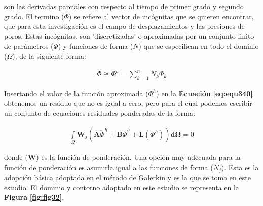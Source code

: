 son las derivadas parciales con respecto al tiempo de primer grado y segundo grado. El termino ($\Phi$) se refiere al vector de incógnitas que se quieren encontrar, que para esta investigación es el campo de desplazamientos y las presiones de poros. Estas incógnitas, son 'discretizadas' o aproximadas por un conjunto finito de parámetros ($\overline{\Phi}$) y funciones de forma ($N$) que se especifican en todo el dominio ($\Omega$), de la siguiente forma:

\begin{ceqn} %
\begin{gather}\label{eq:equ342}
\Phi \cong \Phi^h = \displaystyle\sum_{k=1}^{n} N_k\overline{\Phi}_k
\end{gather}   
\end{ceqn}

Insertando el valor de la función aproximada ($\Phi^h$) en la \textbf{Ecuación} \textbf{\ref{eq:equ340}} obtenemos un residuo que no es igual a cero, pero para el cual
podemos escribir un conjunto de ecuaciones residuales ponderadas de la forma:

\begin{ceqn} %
\begin{gather}\label{eq:equ343}
\int\limits_\Omega \mathbf{W}_j\left(\mathbf{A}\ddot{\Phi}^h + \mathbf{B}\dot{\Phi}^h + \mathbf{L}(\Phi^h)\right)\mathbf{d\Omega} = 0
\end{gather}   
\end{ceqn}

donde ($\mathbf{W}$) es la función de ponderación. Una opción muy adecuada para la función de ponderación es asumirla igual a las funciones de forma ($N_j$). Esta es la adopción básica adoptada en el método de Galerkin y es la que se toma en este estudio. El dominio y contorno adoptado en este estudio se representa en la \textbf{Figura} \textbf{\ref{fig:fig32}}.\bigskip


